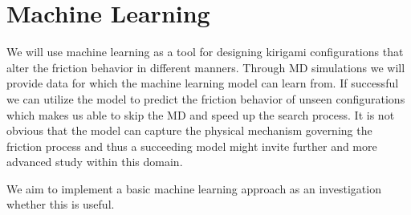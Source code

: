 \chapter{Machine Learning}

We will use machine learning as a tool for designing kirigami configurations that alter the friction behavior in different manners. Through \acrshort{MD} simulations we will provide data for which the machine learning model can learn from. If successful we can utilize the model to predict the friction behavior of unseen configurations which makes us able to skip the \acrshort{MD} and speed up the search process. It is not obvious that the model can capture the physical mechanism governing the friction process and thus a succeeding model might invite further and more advanced study within this domain. 

We aim to implement a basic machine learning approach as an investigation whether this is useful. 

